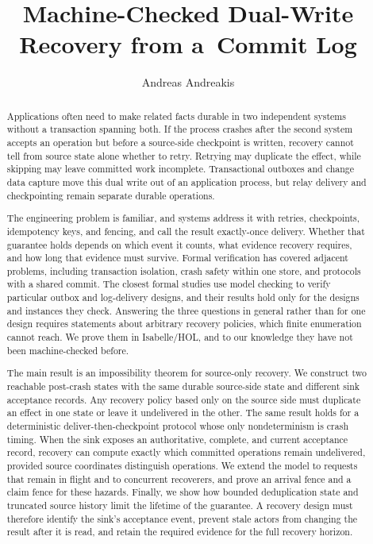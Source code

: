 \documentclass[sigplan,10pt]{acmart}
\title{Machine-Checked Dual-Write Recovery from a~Commit Log}
\author{Andreas Andreakis}
\theoremstyle{plain}
\theoremstyle{definition}
\begin{document}
\begin{abstract}
Applications often need to make related facts durable in two
independent systems without a transaction spanning both. If the process
crashes after the second system accepts an operation but before a
source-side checkpoint is written, recovery cannot tell from source
state alone whether to retry. Retrying may duplicate the effect, while
skipping may leave committed work incomplete. Transactional outboxes
and change data capture move this dual write out of an application
process, but relay delivery and checkpointing remain separate durable
operations.

The engineering problem is familiar, and systems address it
with retries, checkpoints, idempotency keys, and fencing, and call the
result exactly-once delivery. Whether that guarantee holds depends on
which event it counts, what evidence recovery requires, and how long
that evidence must survive. Formal
verification has covered adjacent problems, including transaction
isolation, crash safety within one store, and protocols with a shared
commit. The closest formal studies use model checking to verify
particular outbox and log-delivery designs, and their results hold
only for the designs and instances they check. Answering the
three questions in general rather than for one design requires
statements about arbitrary recovery policies, which finite enumeration
cannot reach. We prove them in Isabelle/HOL, and to our knowledge they
have not been machine-checked before.

The main result is an impossibility theorem for source-only recovery. We construct two reachable
post-crash states with the same durable source-side state and different
sink acceptance records. Any recovery policy based only on the source
side must duplicate an effect in one state or leave it undelivered in
the other. The same result holds for a deterministic
deliver-then-checkpoint protocol whose only nondeterminism is crash
timing. When the sink exposes an authoritative, complete, and current
acceptance record, recovery can compute exactly which committed
operations remain undelivered, provided source coordinates distinguish
operations. We extend the model to requests that remain in flight and
to concurrent recoverers, and prove an arrival fence and a claim fence
for these hazards.
Finally, we show how bounded deduplication state and truncated source
history limit the lifetime of the guarantee. A recovery design must
therefore identify the sink's acceptance event, prevent stale actors
from changing the result after it is read, and retain the required
evidence for the full recovery horizon.
\end{abstract}
\end{document}
